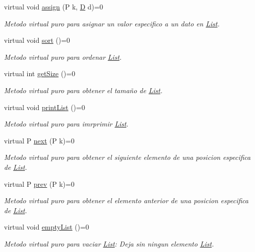 \begin{DoxyCompactItemize}
virtual void \hyperlink{class_list_acb062aa988f4048498b30a2d845a311b}{assign} (P k, \hyperlink{main_8cpp_af316c33cc298530f245e8b55330e86b5}{D} d)=0
\begin{DoxyCompactList}\small\item\em Metodo virtual puro para asignar un valor especifico a un dato en \hyperlink{class_list}{List}. \end{DoxyCompactList}\item 
virtual void \hyperlink{class_list_ae3795939f27cf3e688cd470450e0c27a}{sort} ()=0
\begin{DoxyCompactList}\small\item\em Metodo virtual puro para ordenar \hyperlink{class_list}{List}. \end{DoxyCompactList}\item 
virtual int \hyperlink{class_list_af213bbcf13ee436a0f04cde66e337672}{get\+Size} ()=0
\begin{DoxyCompactList}\small\item\em Metodo virtual puro para obtener el tamaño de \hyperlink{class_list}{List}. \end{DoxyCompactList}\item 
virtual void \hyperlink{class_list_a8b34931e187e7e6b86aad86510ce4f3b}{print\+List} ()=0
\begin{DoxyCompactList}\small\item\em Metodo virtual puro para imrprimir \hyperlink{class_list}{List}. \end{DoxyCompactList}\item 
virtual P \hyperlink{class_list_a4ec3e88e176bb45bc49b030d1c8abb3f}{next} (P k)=0
\begin{DoxyCompactList}\small\item\em Metodo virtual puro para obtener el siguiente elemento de una posicion especifica de \hyperlink{class_list}{List}. \end{DoxyCompactList}\item 
virtual P \hyperlink{class_list_acc1831ae92a288345ef20cb29f3846b2}{prev} (P k)=0
\begin{DoxyCompactList}\small\item\em Metodo virtual puro para obtener el elemento anterior de una posicion especifica de \hyperlink{class_list}{List}. \end{DoxyCompactList}\item 
virtual void \hyperlink{class_list_a24b4f177a70215980e81ef7b2981fa1e}{empty\+List} ()=0
\begin{DoxyCompactList}\small\item\em Metodo virtual puro para vaciar \hyperlink{class_list}{List}\+: Deja sin ningun elemento \hyperlink{class_list}{List}. \end{DoxyCompactList}\end{DoxyCompactItemize}
